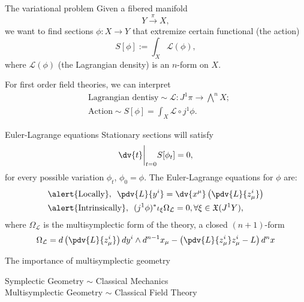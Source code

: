 \begin{frame}{The variational problem}
Given a fibered manifold $$Y\xrightarrow{\pi} X,$$ we want to find sections $\phi: X \rightarrow Y$ that extremize certain functional (the action) $$S[\phi] := \int_X \mathcal{L}(\phi),$$ where $\mathcal{L}(\phi)$ (the \alert{Lagrangian density}) is an $n$-form on $X$. 

For first order field theories, we can interpret
\begin{align*}
    &\text{Lagrangian dentisy}  \sim \mathcal{L}: J^1 \pi \rightarrow \bigwedge^n X;\\
    &\text{Action} \sim S[\phi] = \int_X \mathcal{L}\circ j^1 \phi.
\end{align*}
\end{frame}

\begin{frame}{Euler-Lagrange equations}
Stationary sections will satisfy $$\dv{t} \bigg |_{t = 0} S[\phi_t] = 0,$$ for every possible variation $\phi_t$, $\phi_0 = \phi.$ The Euler-Lagrange equations for $\phi$ are:
\begin{align*}
    &\alert{\text{Locally}},\,\,\,  \pdv{L}{y^i} = \dv{x^\mu} \left( \pdv{L}{z^i_\mu}\right)\\
    &\alert{\text{Intrinsically}},\,\,\, (j^1\phi)^\ast  \iota_\xi\Omega_{\mathcal{L}} = 0, \forall \xi \in \mathfrak{X}(J^1 Y),
\end{align*}
where $\Omega_{\mathcal{L}}$ is the \alert{multisymplectic form} of the theory, a closed $(n+1)$-form $$\Omega_{\mathcal{L}} = d \left( \pdv{L}{z^i_\mu}\right) dy^i \wedge d^{n-1}x_\mu - \left( \pdv{L}{z^i_\mu}z^i_\mu - L \right) d^n x$$
\end{frame}

\begin{frame}{The importance of multisymplectic geometry}
    \begin{center}
        {\huge Symplectic Geometry $\sim$ Classical Mechanics}\\
        \vspace{1.5cm}
        {\huge Multisymplectic Geometry $\sim$ Classical Field Theory}
    \end{center}
\end{frame}
